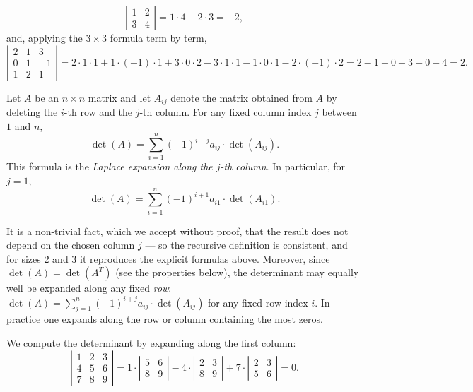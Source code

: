 \begin{example}
\[
\left| \begin{array}{cc} 1 & 2\\ 3 & 4 \end{array} \right| = 1\cdot 4 - 2\cdot 3 = -2,
\]
and, applying the $3\times 3$ formula term by term,
\[
\left| \begin{array}{ccc} 2 & 1 & 3\\ 0 & 1 & -1\\ 1 & 2 & 1 \end{array} \right|
= 2\cdot 1\cdot 1 + 1\cdot(-1)\cdot 1 + 3\cdot 0\cdot 2
- 3\cdot 1\cdot 1 - 1\cdot 0\cdot 1 - 2\cdot(-1)\cdot 2
= 2 - 1 + 0 - 3 - 0 + 4 = 2.
\]
\end{example}

\begin{definition}
Let $A$ be an $n\times n$ matrix and let $A_{ij}$ denote the matrix obtained from $A$ by deleting the $i$-th
row and the $j$-th column. For any fixed column index $j$ between $1$ and $n$,
\[
\det(A) = \sum_{i=1}^{n} (-1)^{i+j} a_{ij}\cdot \det(A_{ij}).
\]
This formula is the \emph{Laplace expansion along the $j$-th column}. In particular, for $j=1$,
\[
\det(A) = \sum_{i=1}^{n} (-1)^{i+1} a_{i 1}\cdot \det(A_{i 1}).
\]
\end{definition}

\begin{remark}
It is a non-trivial fact, which we accept without proof, that the result does not depend on the chosen
column $j$ — so the recursive definition is consistent, and for sizes $2$ and $3$ it reproduces the
explicit formulas above. Moreover, since $\det(A) = \det(A^T)$ (see the properties below), the determinant
may equally well be expanded along any fixed \emph{row}:
$\det(A) = \sum_{j=1}^{n} (-1)^{i+j} a_{ij}\cdot\det(A_{ij})$ for any fixed row index $i$. In practice one
expands along the row or column containing the most zeros.
\end{remark}

\begin{example}
We compute the determinant by expanding along the first column:
\[
\left | \begin{array}{ccc}
1 & 2 & 3\\ 4 & 5 & 6\\ 7 & 8 & 9
\end{array} \right |
= 1\cdot\left | \begin{array}{cc} 5 & 6\\ 8 & 9 \end{array} \right |
- 4 \cdot \left | \begin{array}{cc} 2 & 3\\ 8 & 9 \end{array} \right |
+ 7\cdot \left | \begin{array}{cc} 2 & 3\\ 5 & 6 \end{array} \right | = 0.
\]
\end{example}

